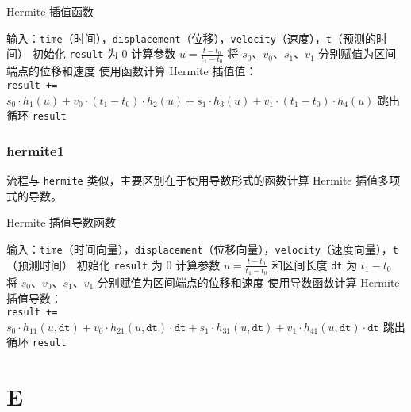 \documentclass[a4paper]{article}
\begin{document}
\begin{algorithm}
\caption{Hermite 插值函数}
\begin{algorithmic}[1]
\STATE 输入：\texttt{time}（时间），\texttt{displacement}（位移），\texttt{velocity}（速度），\texttt{t}（预测的时间）
\STATE 初始化 \texttt{result} 为 $0$
        \STATE 计算参数 \( u = \frac{t - t_0}{t_1 - t_0} \)
        \STATE 将 \( s_0 \)、\( v_0 \)、\( s_1 \)、\( v_1 \) 分别赋值为区间端点的位移和速度
        \STATE 使用函数计算 Hermite 插值值：\\
        \quad \texttt{result +=} \( s_0 \cdot h_1(u) + v_0 \cdot (t_1 - t_0) \cdot h_2(u) + s_1 \cdot h_3(u) + v_1 \cdot (t_1 - t_0) \cdot h_4(u) \)
        \STATE 跳出循环
    \ENDIF
\ENDFOR
\RETURN \texttt{result}
\end{algorithmic}
\end{algorithm}

\subsubsection*{hermite1}
流程与 \texttt{hermite} 类似，主要区别在于使用导数形式的函数计算 Hermite 插值多项式的导数。

\begin{algorithm}
\caption{Hermite 插值导数函数}
\begin{algorithmic}[t]
\STATE 输入：\texttt{time}（时间向量），\texttt{displacement}（位移向量），\texttt{velocity}（速度向量），\texttt{t}（预测时间）
\STATE 初始化 \texttt{result} 为 $0$
        \STATE 计算参数 \( u = \frac{t - t_0}{t_1 - t_0} \) 和区间长度 \texttt{dt} 为 \( t_1 - t_0 \)
        \STATE 将 \( s_0 \)、\( v_0 \)、\( s_1 \)、\( v_1 \) 分别赋值为区间端点的位移和速度
        \STATE 使用导数函数计算 Hermite 插值导数：\\
        \quad \texttt{result +=} \( s_0 \cdot h_{11}(u, \texttt{dt}) + v_0 \cdot h_{21}(u, \texttt{dt}) \cdot \texttt{dt} + s_1 \cdot h_{31}(u, \texttt{dt}) + v_1 \cdot h_{41}(u, \texttt{dt}) \cdot \texttt{dt} \)
        \STATE 跳出循环
    \ENDIF
\ENDFOR
\RETURN \texttt{result}
\end{algorithmic}
\end{algorithm}

\section*{E}
\end{document}
